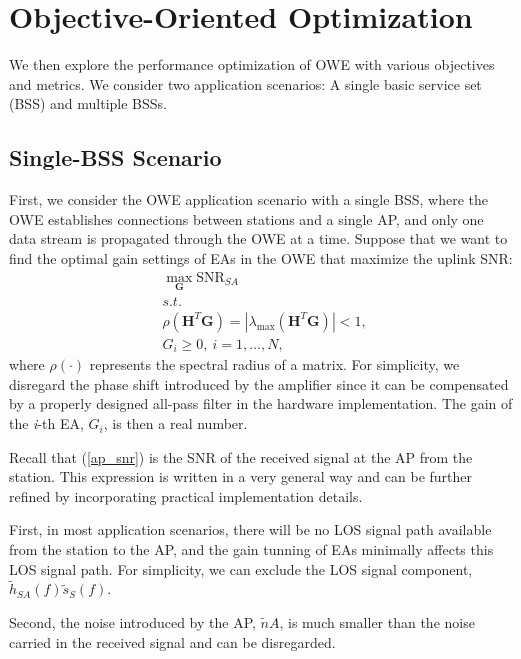 \section{Objective-Oriented Optimization}

We then explore the performance optimization of OWE with various objectives and metrics. We consider two application scenarios: A single basic service set (BSS) and multiple BSSs.

\subsection{Single-BSS Scenario}
First, we consider the OWE application scenario with a single BSS, where the OWE establishes connections between stations and a single AP, and only one data stream is propagated through the OWE at a time.
Suppose that we want to find the optimal gain settings of EAs in the OWE that maximize the uplink SNR:
\begin{equation}
\label{eq17}
\begin{aligned}
    &\max_\mathbf{G} \text{SNR}_{SA} \\
    &\textit{s.t.} \\
    & \rho\left({\mathbf{H}^T}\mathbf{G}\right)=|\lambda_{\max}\left({\mathbf{H}^T}\mathbf{G}\right)|<1,{\ }\\
    & G_i\geq0,{\ }i=1,\dots, N \text{,}
\end{aligned}
\end{equation}
where $\rho(\cdot)$ represents the spectral radius of a matrix. For simplicity, we disregard the phase shift introduced by the amplifier since it can be compensated by a properly designed all-pass filter \cite{THOMPSON2014531} in the hardware implementation. The gain of the \textit{i}-th EA, $G_i$, is then a real number.
\par
Recall that (\ref{ap_snr}) is the SNR of the received signal at the AP from the station. This expression is written in a very general way and can be further refined by incorporating practical implementation details.
\par
First, in most application scenarios, there will be no LOS signal path available from the station to the AP, and the gain tunning of EAs minimally affects this LOS signal path. For simplicity, we can exclude the LOS signal component, ${{\tilde h}_{SA}}\left( f \right){{\tilde s}_{S}}\left( f \right)$.
\par
Second, the noise introduced by the AP, ${{\tilde n}{\scriptscriptstyle A}}$, is much smaller than the noise carried in the received signal and can be disregarded.
